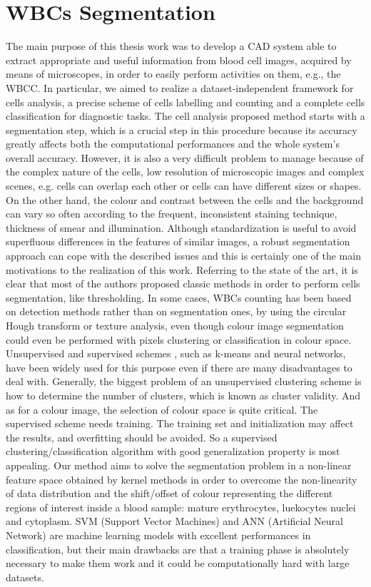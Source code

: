 \documentclass[final,a4paper,12pt,english]{UnicaPhdThesis3}
\begin{document}
\chapter{WBCs Segmentation}
The main purpose of this thesis work was to develop a CAD system able to extract appropriate and useful information from blood cell images, acquired by means of microscopes, in order to easily perform activities on them, e.g., the WBCC. In particular, we aimed to realize a dataset-independent framework for cells analysis, a precise scheme of cells labelling and counting and a complete cells classification for diagnostic tasks.
The cell analysis proposed method starts with a segmentation step, which is a crucial step in this procedure because its accuracy greatly affects both the computational performances and the whole system's overall accuracy. However, it is also a very difficult problem to manage because of the complex nature of the cells, low resolution of microscopic images and complex scenes, e.g. cells can overlap each other or cells can have different sizes or shapes. On the other hand, the colour and contrast between the cells and the background can vary so often according to the frequent, inconsistent staining technique, thickness of smear and illumination. Although standardization is useful to avoid superfluous differences in the features of similar images, a robust segmentation approach can cope with the described issues and this is certainly one of the main motivations to the realization of this work.
Referring to the state of the art, it is clear that most of the authors proposed classic methods in order to perform cells segmentation, like thresholding. In some cases, WBCs counting has been based on detection methods rather than on segmentation ones, by using the circular Hough transform \cite{Mahmood} or texture analysis, even though colour image segmentation could even be performed with pixels clustering or classification in colour space. Unsupervised and supervised schemes \cite{Pan}, such as k-means and neural networks, have been widely used for this purpose even if there are many disadvantages to deal with. Generally, the biggest problem of an unsupervised clustering scheme is how to determine the number of clusters, which is known as cluster validity. And as for a colour image, the selection of colour space is quite critical. The supervised scheme needs training. The training set and initialization may affect the results, and overfitting should be avoided. So a supervised clustering/classification algorithm with good generalization property is most appealing. Our method aims to solve the segmentation problem in a non-linear feature space obtained by kernel methods in order to overcome the non-linearity of data distribution and the shift/offset of colour representing the different regions of interest inside a blood sample: mature erythrocytes, luekocytes nuclei and cytoplasm. SVM (Support Vector Machines) and ANN (Artificial Neural Network) are machine learning models with excellent performances in classification, but their main drawbacks are that a training phase is absolutely necessary to make them work and it could be computationally hard with large datasets.
\end{document}
